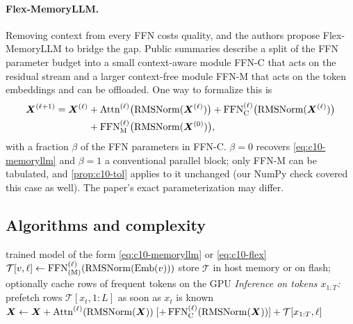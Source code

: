 \paragraph{Flex-MemoryLLM.} Removing context from every FFN costs quality, and the authors propose
Flex-MemoryLLM to bridge the gap. Public summaries describe a split of the FFN parameter budget into
a small context-aware module FFN-C that acts on the residual stream and a larger context-free
module FFN-M that acts on the token embeddings and can be offloaded. One way to formalize this is
\begin{equation}
\begin{aligned}
  \bm{X}^{(\ell+1)} = \bm{X}^{(\ell)} &+ \mathrm{Attn}^{(\ell)}\bigl(\operatorname{RMSNorm}(\bm{X}^{(\ell)})\bigr)
  + \mathrm{FFN}^{(\ell)}_{\mathrm{C}}\bigl(\operatorname{RMSNorm}(\bm{X}^{(\ell)})\bigr)\\
  &+ \mathrm{FFN}^{(\ell)}_{\mathrm{M}}\bigl(\operatorname{RMSNorm}(\bm{X}^{(0)})\bigr),
\end{aligned}
  \label{eq:c10-flex}
\end{equation}
with a fraction $\beta$ of the FFN parameters in FFN-C. $\beta = 0$ recovers
\cref{eq:c10-memoryllm} and $\beta = 1$ a conventional parallel block; only FFN-M can be tabulated,
and \cref{prop:c10-tol} applies to it unchanged (our NumPy check covered this case as well). The
paper's exact parameterization may differ.

\subsection{Algorithms and complexity}

\begin{algorithm}[t]
\caption{Building and using token-wise lookups (our formalization)}\label{alg:c10-tol}
\begin{algorithmic}[1]
\Require trained model of the form \eqref{eq:c10-memoryllm} or \eqref{eq:c10-flex}
 
  \State $\mathcal{T}[v,\ell] \gets \mathrm{FFN}^{(\ell)}_{(\mathrm{M})}(\operatorname{RMSNorm}(\mathrm{Emb}(v)))$
\EndFor
\State store $\mathcal{T}$ in host memory or on flash; optionally cache rows of frequent tokens on the GPU
\Statex \textit{Inference on tokens $x_{1:T}$:}
\State prefetch rows $\mathcal{T}[x_t, 1{:}L]$ as soon as $x_t$ is known
  \State $\bm{X} \gets \bm{X} + \mathrm{Attn}^{(\ell)}(\operatorname{RMSNorm}(\bm{X})) \;[+\, \mathrm{FFN}^{(\ell)}_{\mathrm{C}}(\operatorname{RMSNorm}(\bm{X}))] + \mathcal{T}[x_{1:T}, \ell]$
\EndFor
\end{algorithmic}
\end{algorithm}

